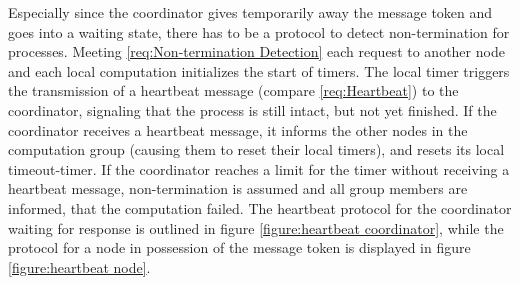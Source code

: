 		Especially since the coordinator gives temporarily away the message token and goes into a waiting state, there has to be a protocol to detect non-termination for processes. Meeting \ref{req:Non-termination Detection} each request to another node and each local computation initializes the start of timers. The local timer triggers the transmission of a heartbeat message (compare \ref{req:Heartbeat}) to the coordinator, signaling that the process is still intact, but not yet finished. If the coordinator receives a heartbeat message, it informs the other nodes in the computation group (causing them to reset their local timers), and resets its local timeout-timer. If the coordinator reaches a limit for the timer without receiving a heartbeat message, non-termination is assumed and all group members are informed, that the computation failed. The heartbeat protocol for the coordinator waiting for response is outlined in figure \ref{figure:heartbeat coordinator}, while the protocol for a node in possession of the message token is displayed in figure \ref{figure:heartbeat node}.  
		

